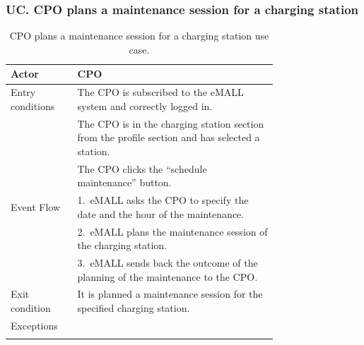 \subsubsection*{UC\cuc . CPO plans a maintenance session for a charging station}
\begin{center}
    \begin{longtable}{lp{0.75\linewidth}}
        \hline
        Actor            & CPO                                                                                             \\
        \hline
        Entry conditions & The CPO is subscribed to the eMALL system and correctly logged in.                              \\
        & The CPO is in the charging station section from the profile section and has selected a station. \\
        & The CPO clicks the ``schedule maintenance'' button.                                             \\
        \hline
        Event Flow       & 1.\ eMALL asks the CPO to specify the date and the hour of the maintenance.                     \\
        & 2.\ eMALL plans the maintenance session of the charging station.                                \\
        & 3.\ eMALL sends back the outcome of the planning of the maintenance to the CPO.                 \\
        \hline
        Exit condition   & It is planned a maintenance session for the specified charging station.                         \\
        \hline
        Exceptions       &                                                                                                 \\
        \hline
        \caption{CPO plans a maintenance session for a charging station use case.}
        \label{tab: CPO_plans_maintenance_use_case}
    \end{longtable}

\end{center}

